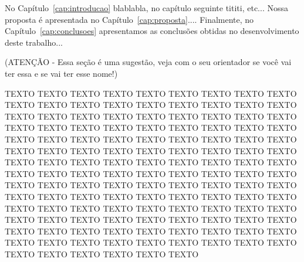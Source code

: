 No Capítulo~\ref{cap:introducao} blablabla, no capítulo seguinte tititi, etc... Nossa proposta é apresentada no Capítulo~\ref{cap:proposta}.... Finalmente, no Capítulo~\ref{cap:conclusoes} apresentamos as conclusões obtidas no desenvolvimento deste trabalho...

(ATENÇÃO - Essa seção é uma sugestão, veja com o seu orientador se você vai ter essa e se vai ter esse nome!)

TEXTO TEXTO TEXTO TEXTO TEXTO TEXTO TEXTO TEXTO TEXTO TEXTO TEXTO TEXTO TEXTO TEXTO TEXTO TEXTO TEXTO TEXTO TEXTO TEXTO TEXTO TEXTO TEXTO TEXTO TEXTO TEXTO TEXTO TEXTO TEXTO TEXTO TEXTO TEXTO TEXTO TEXTO TEXTO TEXTO TEXTO TEXTO TEXTO TEXTO TEXTO TEXTO TEXTO TEXTO TEXTO TEXTO TEXTO TEXTO TEXTO TEXTO TEXTO TEXTO TEXTO TEXTO TEXTO TEXTO TEXTO TEXTO TEXTO TEXTO TEXTO TEXTO TEXTO TEXTO TEXTO TEXTO TEXTO TEXTO TEXTO TEXTO TEXTO TEXTO TEXTO TEXTO TEXTO TEXTO TEXTO TEXTO TEXTO TEXTO TEXTO TEXTO TEXTO TEXTO TEXTO TEXTO TEXTO TEXTO TEXTO TEXTO TEXTO TEXTO TEXTO TEXTO TEXTO TEXTO TEXTO TEXTO TEXTO TEXTO TEXTO TEXTO TEXTO TEXTO TEXTO TEXTO TEXTO TEXTO TEXTO TEXTO TEXTO TEXTO TEXTO TEXTO TEXTO TEXTO TEXTO TEXTO TEXTO TEXTO TEXTO TEXTO TEXTO TEXTO TEXTO TEXTO TEXTO TEXTO TEXTO TEXTO TEXTO TEXTO